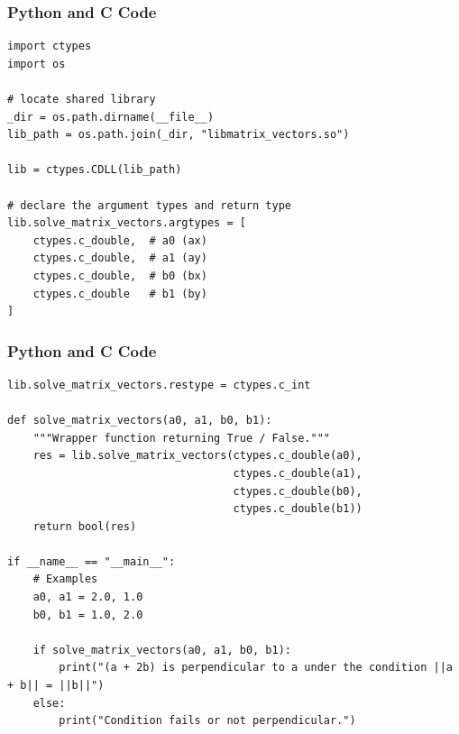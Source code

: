 \documentclass{beamer}
\begin{document}
\begin{frame}[fragile]
\frametitle{Python and C Code}

\begin{lstlisting}
import ctypes
import os

# locate shared library
_dir = os.path.dirname(__file__)
lib_path = os.path.join(_dir, "libmatrix_vectors.so")

lib = ctypes.CDLL(lib_path)

# declare the argument types and return type
lib.solve_matrix_vectors.argtypes = [
    ctypes.c_double,  # a0 (ax)
    ctypes.c_double,  # a1 (ay)
    ctypes.c_double,  # b0 (bx)
    ctypes.c_double   # b1 (by)
]
\end{lstlisting}

\end{frame}
\begin{frame}[fragile]
\frametitle{Python and C Code}

\begin{lstlisting}
lib.solve_matrix_vectors.restype = ctypes.c_int

def solve_matrix_vectors(a0, a1, b0, b1):
    """Wrapper function returning True / False."""
    res = lib.solve_matrix_vectors(ctypes.c_double(a0),
                                   ctypes.c_double(a1),
                                   ctypes.c_double(b0),
                                   ctypes.c_double(b1))
    return bool(res)

if __name__ == "__main__":
    # Examples
    a0, a1 = 2.0, 1.0
    b0, b1 = 1.0, 2.0

    if solve_matrix_vectors(a0, a1, b0, b1):
        print("(a + 2b) is perpendicular to a under the condition ||a + b|| = ||b||")
    else:
        print("Condition fails or not perpendicular.")
\end{lstlisting}

\end{frame}

 
\end{document}
